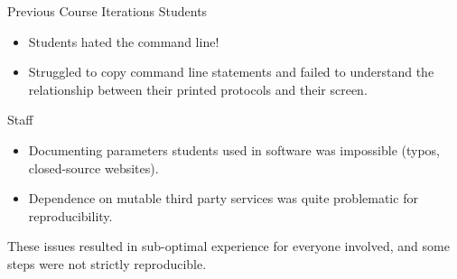 \documentclass[final,t]{beamer}
\begin{document}
\begin{frame}[fragile]
\begin{columns}[t]
\begin{column}{.36\linewidth}
            \begin{block}{Previous Course Iterations}
                \justifying
                Students
                \begin{itemize}
                    \item Students hated the command line!
                    \item Struggled to copy command line statements and failed
                        to understand the relationship between their printed
                        protocols and their screen.
                \end{itemize}
                Staff
                \begin{itemize}
                    \item Documenting parameters students used in
                        software was impossible (typos, closed-source websites).
                    \item Dependence on mutable third party services was
                        quite problematic for reproducibility.
                \end{itemize}

                These issues resulted in sub-optimal experience for everyone
                involved, and some steps were not strictly reproducible.
            \end{block}


\end{column}
\end{columns}
\end{frame}
\end{document}
